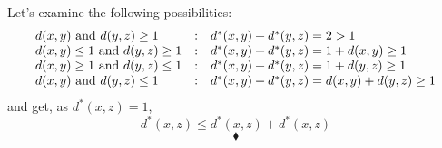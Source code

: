 Let's examine the following possibilities:
\begin{align*}
\begin{array}{l c  l}
d(x, y)\text{ and } d(y, z)\geq 1&: &d^*(x, y)+d^*(y, z)=2>1\\
d(x, y)\leq 1\text{ and } d(y, z)\geq 1&: &d^*(x, y)+d^*(y, z)=1+d(x, y)\geq 1\\
d(x, y)\geq 1 \text{ and } d(y, z)\leq 1&: &d^*(x, y)+d^*(y, z)=1+d(y, z)\geq 1
\\
d(x, y)\text{ and } d(y, z)\leq 1&: &d^*(x, y)+d^*(y, z)=d(x, y)+d(y, z)\geq 1
\end{array}
\end{align*}
and get, as $d^*(x, z)=1$, $$d^*(x, z)\leq d^*(x, z)+d^*(x, z)$$
$$\blacklozenge$$

\renewcommand{\thesubsection}{\thesection.\arabic{subsection}}
